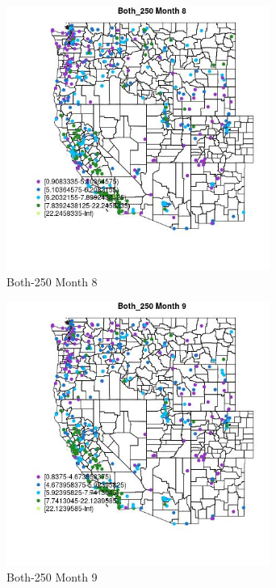 \clearpage 

\begin{figure} 
\centering  
\includegraphics[width=0.77\textwidth]{Code_Outputs/ML_input_report_ML_input_PM25_Step5_part_d_de_duplicated_aves_ML_input_MapObsMo8Both_250.jpg} 
\caption{\label{fig:ML_input_report_ML_input_PM25_Step5_part_d_de_duplicated_aves_ML_inputMapObsMo8Both_250}Both-250 Month 8} 
\end{figure} 
 

\begin{figure} 
\centering  
\includegraphics[width=0.77\textwidth]{Code_Outputs/ML_input_report_ML_input_PM25_Step5_part_d_de_duplicated_aves_ML_input_MapObsMo9Both_250.jpg} 
\caption{\label{fig:ML_input_report_ML_input_PM25_Step5_part_d_de_duplicated_aves_ML_inputMapObsMo9Both_250}Both-250 Month 9} 
\end{figure} 
 

